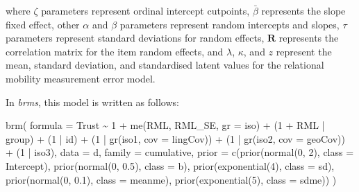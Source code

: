 \documentclass[
  man,floatsintext]{apa6}
\newenvironment{Shaded}{\begin{snugshade}}{\end{snugshade}}
\newcommand{\AttributeTok}[1]{\textcolor[rgb]{0.77,0.63,0.00}{#1}}
\newcommand{\DecValTok}[1]{\textcolor[rgb]{0.00,0.00,0.81}{#1}}
\newcommand{\FloatTok}[1]{\textcolor[rgb]{0.00,0.00,0.81}{#1}}
\newcommand{\FunctionTok}[1]{\textcolor[rgb]{0.00,0.00,0.00}{#1}}
\newcommand{\NormalTok}[1]{#1}
\newcommand{\SpecialCharTok}[1]{\textcolor[rgb]{0.00,0.00,0.00}{#1}}
\begin{document}
where \(\zeta\) parameters represent ordinal intercept cutpoints, \(\bar{\beta}\) represents the slope fixed effect, other \(\alpha\) and \(\beta\) parameters represent random intercepts and slopes, \(\tau\) parameters represent standard deviations for random effects, \(\textbf{R}\) represents the correlation matrix for the item random effects, and \(\lambda\), \(\kappa\), and \(z\) represent the mean, standard deviation, and standardised latent values for the relational mobility measurement error model.

In \emph{brms}, this model is written as follows:

\begin{Shaded}
\begin{Highlighting}[]
\FunctionTok{brm}\NormalTok{(}
  \AttributeTok{formula =}\NormalTok{ Trust }\SpecialCharTok{\textasciitilde{}} \DecValTok{1} \SpecialCharTok{+} \FunctionTok{me}\NormalTok{(RML, RML\_SE, }\AttributeTok{gr =}\NormalTok{ iso) }\SpecialCharTok{+} 
\NormalTok{    (}\DecValTok{1} \SpecialCharTok{+}\NormalTok{ RML }\SpecialCharTok{|}\NormalTok{ group) }\SpecialCharTok{+}\NormalTok{ (}\DecValTok{1} \SpecialCharTok{|}\NormalTok{ id) }\SpecialCharTok{+}\NormalTok{ (}\DecValTok{1} \SpecialCharTok{|} \FunctionTok{gr}\NormalTok{(iso1, }\AttributeTok{cov =}\NormalTok{ lingCov)) }\SpecialCharTok{+} 
\NormalTok{    (}\DecValTok{1} \SpecialCharTok{|} \FunctionTok{gr}\NormalTok{(iso2, }\AttributeTok{cov =}\NormalTok{ geoCov)) }\SpecialCharTok{+}\NormalTok{ (}\DecValTok{1} \SpecialCharTok{|}\NormalTok{ iso3), }
  \AttributeTok{data =}\NormalTok{ d, }\AttributeTok{family =}\NormalTok{ cumulative,}
  \AttributeTok{prior =} \FunctionTok{c}\NormalTok{(}\FunctionTok{prior}\NormalTok{(}\FunctionTok{normal}\NormalTok{(}\DecValTok{0}\NormalTok{, }\DecValTok{2}\NormalTok{), }\AttributeTok{class =}\NormalTok{ Intercept),}
            \FunctionTok{prior}\NormalTok{(}\FunctionTok{normal}\NormalTok{(}\DecValTok{0}\NormalTok{, }\FloatTok{0.5}\NormalTok{), }\AttributeTok{class =}\NormalTok{ b),}
            \FunctionTok{prior}\NormalTok{(}\FunctionTok{exponential}\NormalTok{(}\DecValTok{4}\NormalTok{), }\AttributeTok{class =}\NormalTok{ sd),}
            \FunctionTok{prior}\NormalTok{(}\FunctionTok{normal}\NormalTok{(}\DecValTok{0}\NormalTok{, }\FloatTok{0.1}\NormalTok{), }\AttributeTok{class =}\NormalTok{ meanme),}
            \FunctionTok{prior}\NormalTok{(}\FunctionTok{exponential}\NormalTok{(}\DecValTok{5}\NormalTok{), }\AttributeTok{class =}\NormalTok{ sdme))}
\NormalTok{  )}
\end{Highlighting}
\end{Shaded}
\end{document}
